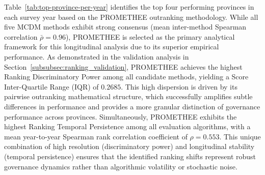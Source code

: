 \documentclass[12pt,a4paper]{article}
\begin{document}
\FloatBarrier

Table~\ref{tab:top-province-per-year} identifies the top four performing provinces in each survey year based on the PROMETHEE outranking methodology. While all five MCDM methods exhibit strong consensus (mean inter-method Spearman correlation $\bar{\rho} = 0.96$), PROMETHEE is selected as the primary analytical framework for this longitudinal analysis due to its superior empirical performance. As demonstrated in the validation analysis in Section~\ref{subsubsec:ranking_validation}, PROMETHEE achieves the highest Ranking Discriminatory Power among all candidate methods, yielding a Score Inter-Quartile Range ($\mathrm{IQR}$) of $0.2685$. This high dispersion is driven by its pairwise outranking mathematical structure, which successfully amplifies subtle differences in performance and provides a more granular distinction of governance performance across provinces. Simultaneously, PROMETHEE exhibits the highest Ranking Temporal Persistence among all evaluation algorithms, with a mean year-to-year Spearman rank correlation coefficient of $\rho = 0.553$. This unique combination of high resolution (discriminatory power) and longitudinal stability (temporal persistence) ensures that the identified ranking shifts represent robust governance dynamics rather than algorithmic volatility or stochastic noise.
\end{document}
